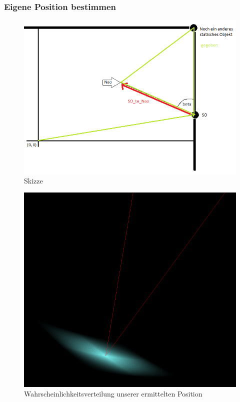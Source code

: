 \subsubsection{Eigene Position bestimmen}
\begin{figure}[h]
\begin{center}
\includegraphics[scale=0.6]{Positionsbestimmung}
\end{center}
\caption{Skizze}
\end{figure}
\begin{figure}[h]
\begin{center}
\includegraphics[scale=0.3]{654px-Pos_wahrscheinlichkeit}
\end{center}
\caption{Wahrscheinlichkeitsverteilung unserer ermittelten Position}
\end{figure}
